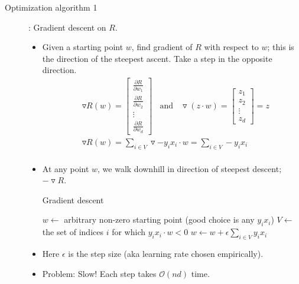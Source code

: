 \documentclass[10pt]{article}
\begin{document}
\begin{description}
	\item[Optimization algorithm 1]: Gradient descent on $R$.
		\begin{itemize}
			\item Given a starting point $w$, find gradient of $R$ with respect to $w$; this is the direction of the steepest ascent. Take a step in the opposite direction.
				\begin{align*}
					& \triangledown R(w) =
						\begin{bmatrix}
 							\frac{\partial R}{\partial w_{1}}\\
 							\frac{\partial R}{\partial w_{2}} \\
 							\vdots \\
 							\frac{\partial R}{\partial w_{d}}
 						\end{bmatrix}
 					\ \ \ \ \text{and} \ \ \ \
 					\triangledown(z \cdot w) =
						\begin{bmatrix}
 							z_{1} \\
 							z_{2} \\
 							\vdots \\
 							z_{d}
 						\end{bmatrix} = z\\
 					& \triangledown R(w) = \sum_{i \in V} \triangledown -y_{i}x_{i} \cdot w = \sum_{i \in V} -y_{i}x_{i}\\
				\end{align*}
			\item At any point $w$, we walk downhill in direction of steepest descent; $- \triangledown R$.
			
			\begin{algorithm*}
			\caption{Gradient descent}
			\begin{algorithmic}
			\State $w \leftarrow$ arbitrary non-zero starting point (good choice is any $y_{i}x_{i}$)
			\While {R(w) $>$ 0}
			\State $V \leftarrow$ the set of indices $i$ for which $y_{i}x_{i} \cdot w < 0$
			\State $w \leftarrow w + \epsilon \sum_{i \in V} y_{i}x_{i}$
			\EndWhile
			\end{algorithmic}
			\end{algorithm*}

			\item Here $\epsilon$ is the step size (aka learning rate chosen empirically).
			
			\item Problem: Slow! Each step takes $\mathcal{O}(nd)$ time.
		\end{itemize}
	

\end{description}
\end{document}
